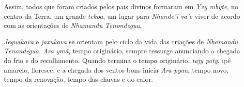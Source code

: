 
 

Assim, todos que foram criados pelos pais divinos formaram em \emph{Yvy
mbyte}, no centro da Terra, um grande \emph{tekoa}, um lugar para
\emph{Nhande'i va'e} viver de acordo com as orientações de
\emph{Nhamandu Tenondegua}.

\emph{Jeguakava} e \emph{jaxukava} se orientam pelo ciclo da vida das
criações de \emph{Nhamandu Tenondegua}. \emph{Ara ymã}, tempo
originário, sempre ressurge anunciando a chegada do frio e do
recolhimento. Quando termina o tempo originário, \emph{tajy poty}, ipê
amarelo, floresce, e a chegada dos ventos bons inicia \emph{Ara pyau},
tempo novo, tempo da renovação, tempo das chuvas e do calor.
